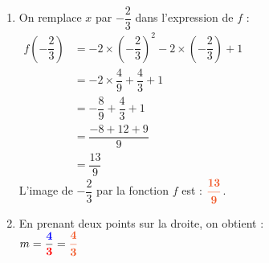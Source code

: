 \documentclass[a4paper,11pt]{article}
\newcounter{seancenum}
\newcounter{seancenumD}
\begin{document}
\setcounter{seancenumD}{10}
\newpage
\begin{seanceD}{} %
\begin{enumerate}
\item On remplace $x$ par $-\dfrac{2}{3}$ dans l'expression de $f$ :\\
     
    $\begin{aligned}
    f\left(-\dfrac{2}{3}\right)&=-2\times \left(-\dfrac{2}{3}\right)^2-2\times \left(-\dfrac{2}{3}\right)+1\\
    &=-2\times\dfrac{4}{9}+\dfrac{4}{3}+1\\
    &=-\dfrac{8}{9}+\dfrac{4}{3}+1\\
    &=\dfrac{-8+12+9}{9}\\
    &=\dfrac{13}{9}
    \end{aligned}$\\
    
    L'image de $-\dfrac{2}{3}$ par la fonction $f$ est : ${\color[HTML]{f15929}\boldsymbol{\dfrac{13}{9}}}$.

\item En prenant deux points sur la droite, on obtient :\\
     
    $m=\dfrac{{\color{blue}\boldsymbol{4}}}{{\color{red}\boldsymbol{3}}}={\color[HTML]{f15929}\boldsymbol{\dfrac{4}{3}}}$\\\begin{tikzpicture}[baseline,scale = 0.75]


\end{tikzpicture}
\end{enumerate}
\end{seanceD}
\end{document}
